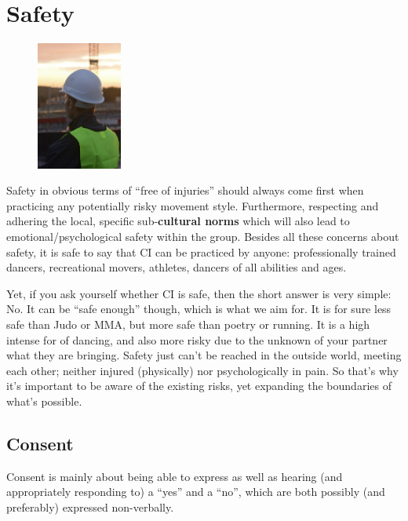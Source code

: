 \section{Safety}\label{sec:safety}

\begin{figure}
    \centering
    \includegraphics[width=0.25\textwidth]{images/safety}
\end{figure}

Safety in obvious terms of ``free of injuries'' should always come first when practicing any potentially risky movement style.
Furthermore, respecting and adhering the local, specific sub-\textbf{cultural norms} which will also lead to emotional/psychological safety within the group.
Besides all these concerns about safety, it is safe to say that CI can be practiced by anyone: professionally trained dancers, recreational movers, athletes, dancers of all abilities and ages.

Yet, if you ask yourself whether CI is safe, then the short answer is very simple: No.
It can be ``safe enough'' though, which is what we aim for.
It is for sure less safe than Judo or MMA, but more safe than poetry or running.
It is a high intense for of dancing, and also more risky due to the unknown of your partner what they are bringing.
Safety just can't be reached in the outside world, meeting each other;
neither injured (physically) nor psychologically in pain.
So that's why it's important to be aware of the existing risks, yet expanding the boundaries of what's possible.

\subsection{Consent}\label{subsec:consent}

Consent is mainly about being able to express as well as hearing (and appropriately responding to) a ``yes'' and a ``no'', which are both possibly (and preferably) expressed non-verbally.

